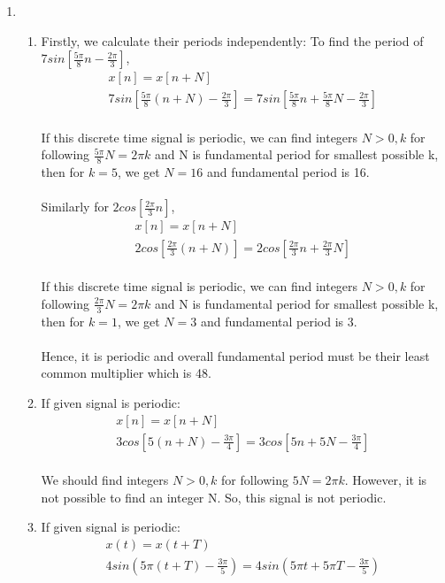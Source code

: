 \documentclass[10pt,a4paper, margin=1in]{article}
\begin{document}
\begin{enumerate}
\item
    \begin{enumerate}
    \item
    Firstly, we calculate their periods independently:
    To find the period of $7sin[\frac{5\pi}{8}n-\frac{2\pi}{3}]$, \\
    \begin{gather*}
        x[n] = x[n+N] \\
        7sin[\frac{5\pi}{8}(n+N)-\frac{2\pi}{3}]=7sin[\frac{5\pi}{8}n+\frac{5\pi}{8}N-\frac{2\pi}{3}]
    \end{gather*} \\
    If this discrete time signal is periodic, we can find integers $N>0,k$ for following $\frac{5\pi}{8}N=2\pi k$ and N is fundamental period for smallest possible k, then for $k=5$, we get $N=16$ and fundamental period is 16. \\ \\ Similarly for $2cos[\frac{2\pi}{3}n]$,
    \begin{gather*}
        x[n] = x[n+N] \\
        2cos[\frac{2\pi}{3}(n+N)]=2cos[\frac{2\pi}{3}n+\frac{2\pi}{3}N]
    \end{gather*} \\
    If this discrete time signal is periodic, we can find integers $N>0,k$ for following $\frac{2\pi}{3}N=2\pi k$ and N is fundamental period for smallest possible k, then for $k=1$, we get $N=3$ and fundamental period is 3. \\ \\
    Hence, it is periodic and overall fundamental period must be their least common multiplier which is 48.
    \item %
    If given signal is periodic:
    \begin{gather*}
        x[n] = x[n+N] \\
        3cos[5(n+N)-\frac{3\pi}{4}] = 3cos[5n+5N-\frac{3\pi}{4}]
    \end{gather*} \\
    We should find integers $N>0,k$ for following $5N=2\pi k$. However, it is not possible to find an integer N. So, this signal is not periodic.
    \item %
    If given signal is periodic:
    \begin{gather*}
         x(t) = x(t+T) \\
         4sin(5\pi(t+T)-\frac{3\pi}{5}) = 4sin(5\pi t+5\pi T-\frac{3\pi}{5})

\end{gather*}
\end{enumerate}
\end{enumerate}
\end{document}
